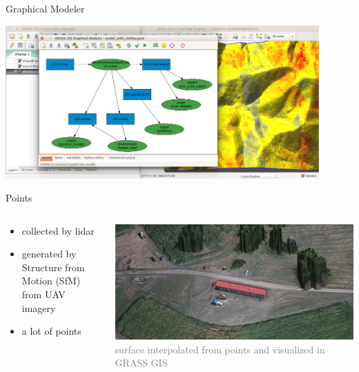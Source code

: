 \documentclass[xcolor={dvipsnames,usenames},beamer,aspectratio=169]{beamer}
\begin{document}
\begin{frame}{Graphical Modeler}

\begin{center}
  \includegraphics[width=0.9\textwidth]{grass/modeler}
\end{center}

\end{frame}

\begin{frame}{Points}

\begin{columns}
\begin{column}{0.3\textwidth}

\begin{itemize}
  \item collected by lidar
  \item generated by Structure from Motion (SfM) from UAV imagery
  \item a lot of points
\end{itemize}

\end{column}
\begin{column}{0.65\textwidth}

\begin{center}
  \includegraphics[width=\textwidth]{agisoft_detail}
  \\
  \textcolor{gray}{surface interpolated from points and visualized in GRASS GIS}
\end{center}

\end{column}
\end{columns}

\end{frame}
\end{document}
